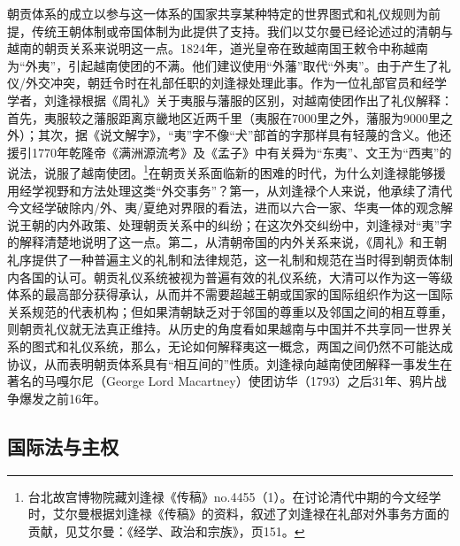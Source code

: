 \documentclass[a4paper, 12pt, openright]{ctexbook}
\begin{document}
朝贡体系的成立以参与这一体系的国家共享某种特定的世界图式和礼仪规则为前提，传统王朝体制或帝国体制为此提供了支持。我们以艾尔曼已经论述过的清朝与越南的朝贡关系来说明这一点。1824年，道光皇帝在致越南国王敕令中称越南为“外夷”，引起越南使团的不满。他们建议使用“外藩”取代“外夷”。由于产生了礼仪/外交冲突，朝廷令时在礼部任职的刘逢禄处理此事。作为一位礼部官员和经学学者，刘逢禄根据《周礼》关于夷服与藩服的区别，对越南使团作出了礼仪解释：首先，夷服较之藩服距离京畿地区近两千里（夷服在7000里之外，藩服为9000里之外）；其次，据《说文解字》，“夷”字不像“犬”部首的字那样具有轻蔑的含义。他还援引1770年乾隆帝《满洲源流考》及《孟子》中有关舜为“东夷”、文王为“西夷”的说法，说服了越南使团。\footnote{台北故宫博物院藏刘逢禄《传稿》no.4455（1）。在讨论清代中期的今文经学时，艾尔曼根据刘逢禄《传稿》的资料，叙述了刘逢禄在礼部对外事务方面的贡献，见艾尔曼：《经学、政治和宗族》，页151。}在朝贡关系面临新的困难的时代，为什么刘逢禄能够援用经学视野和方法处理这类“外交事务”？第一，从刘逢禄个人来说，他承续了清代今文经学破除内/外、夷/夏绝对界限的看法，进而以六合一家、华夷一体的观念解说王朝的内外政策、处理朝贡关系中的纠纷；在这次外交纠纷中，刘逢禄对“夷”字的解释清楚地说明了这一点。第二，从清朝帝国的内外关系来说，《周礼》和王朝礼序提供了一种普遍主义的礼制和法律规范，这一礼制和规范在当时得到朝贡体制内各国的认可。朝贡礼仪系统被视为普遍有效的礼仪系统，大清可以作为这一等级体系的最高部分获得承认，从而并不需要超越王朝或国家的国际组织作为这一国际关系规范的代表机构；但如果清朝缺乏对于邻国的尊重以及邻国之间的相互尊重，则朝贡礼仪就无法真正维持。从历史的角度看如果越南与中国并不共享同一世界关系的图式和礼仪系统，那么，无论如何解释夷这一概念，两国之间仍然不可能达成协议，从而表明朝贡体系具有“相互间的”性质。刘逢禄向越南使团解释一事发生在著名的马嘎尔尼（George Lord Macartney）使团访华（1793）之后31年、鸦片战争爆发之前16年。

\subsection{国际法与主权}
\end{document}
